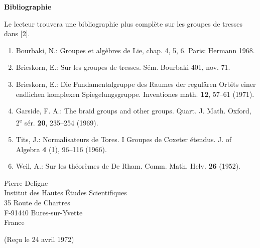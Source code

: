 \documentclass[10pt]{article}
\begin{document}
\begin{center}
\bfseries Bibliographie
\end{center}
Le lecteur trouvera une bibliographie plus complète sur les groupes de tresses dans [2].
\begin{enumerate}[label=\arabic*.]
\item Bourbaki, N.: Groupes et algèbres de Lie, chap. 4, 5, 6. Paris: Hermann 1968.
\item Brieskorn, E.: Sur les groupes de tresses. Sém. Bourbaki 401, nov. 71.
\item Brieskorn, E.: Die Fundamentalgruppe des Raumes der regulären Orbits einer endlichen komplexen Spiegelungsgruppe. Inventiones math. \textbf{12}, 57--61 (1971).
\item Garside, F. A.: The braid groups and other groups. Quart. J. Math. Oxford, 2\textsuperscript{e} sér. \textbf{20}, 235--254 (1969).
\item Tits, J.: Normalisateurs de Tores. I Groupes de Coxeter étendus. J. of Algebra \textbf{4} (1), 96--116 (1966).
\item Weil, A.: Sur les théorèmes de De Rham. Comm. Math. Helv. \textbf{26} (1952).
\end{enumerate}

\begin{flushright}
Pierre Deligne\\
Institut des Hautes Études Scientifiques\\
35 Route de Chartres\\
F-91440 Bures-sur-Yvette\\
France
\end{flushright}

\begin{center}
(Reçu le 24 avril 1972)
\end{center}
\end{document}
